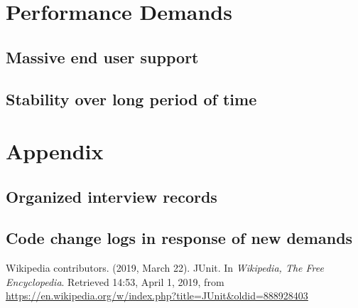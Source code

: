 \documentclass[a4paper]{report}
\begin{document}
\chapter{Performance Demands}

\section{Massive end user support}

\section{Stability over long period of time}

\chapter{Appendix}

\section{Organized interview records}

\section{Code change logs in response of new demands}


\begin{thebibliography}{A}


Wikipedia contributors. (2019, March 22). JUnit. In \emph{Wikipedia, The Free Encyclopedia}. Retrieved 14:53, April 1, 2019, from \url{https://en.wikipedia.org/w/index.php?title=JUnit&oldid=888928403}
\end{thebibliography}
\end{document}
